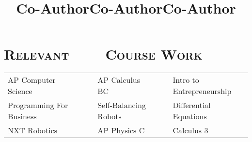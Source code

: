 \begin{resume}
\title{Co-Author}
\begin{position}
\end{position}

\title{Co-Author}
\begin{position}
\end{position}

\title{Co-Author}
\begin{position}
\end{position}

\section{\textsc{Relevant \ \ \ \ Course Work}}
  \begin{tabular}{lllll}
  AP Computer Science      & \ \ & AP Calculus BC        & \ \ & Intro to Entrepreneurship \\ 
  Programming For Business & \ \ & Self-Balancing Robots & \ \ & Differential Equations \\
  NXT Robotics             & \ \ & AP Physics C          & \ \ & Calculus 3 \\
  \end{tabular}

\end{resume}
